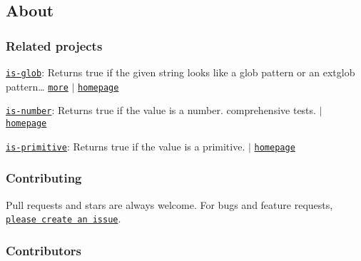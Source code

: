 \subsection*{About}

\subsubsection*{Related projects}


\begin{DoxyItemize}
\item \href{https://www.npmjs.com/package/is-glob}{\tt is-\/glob}\+: Returns {\ttfamily true} if the given string looks like a glob pattern or an extglob pattern… \href{https://github.com/jonschlinkert/is-glob}{\tt more} $\vert$ \href{https://github.com/jonschlinkert/is-glob}{\tt homepage}
\item \href{https://www.npmjs.com/package/is-number}{\tt is-\/number}\+: Returns true if the value is a number. comprehensive tests. $\vert$ \href{https://github.com/jonschlinkert/is-number}{\tt homepage}
\item \href{https://www.npmjs.com/package/is-primitive}{\tt is-\/primitive}\+: Returns {\ttfamily true} if the value is a primitive. $\vert$ \href{https://github.com/jonschlinkert/is-primitive}{\tt homepage}
\end{DoxyItemize}

\subsubsection*{Contributing}

Pull requests and stars are always welcome. For bugs and feature requests, \href{../../issues/new}{\tt please create an issue}.

\subsubsection*{Contributors}

